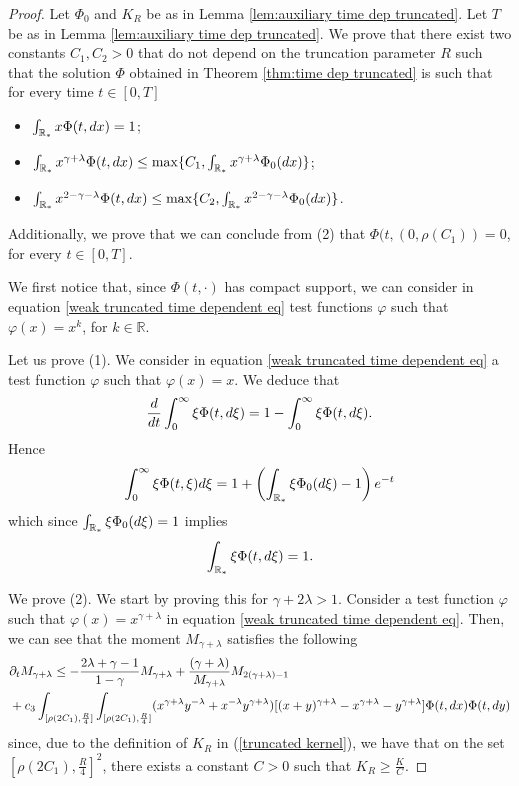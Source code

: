 \documentclass[11pt]{article}
\numberwithin{equation}{section}
\theoremstyle{plain}
\newcommand{\der}{\textup{d}}
\begin{document}
\begin{proof}

Let $\Phi_0$ and $K_R$ be as in Lemma \ref{lem:auxiliary time dep truncated}. 
Let $T$ be as in Lemma \ref{lem:auxiliary time dep truncated}. We prove that there exist two constants $C_{1},C_{2}>0$ that do not depend on the truncation parameter $R$ such that the solution $\Phi$ obtained in Theorem \ref{thm:time dep truncated} is such that for every time $t \in [0, T] $ 
\begin{itemize}
        \item[(1)]
$\int_{\mathbb R_* } x \Phi(t,\der x) = 1$; 
    \item[(2)]$\int_{\mathbb R_* } x^{\gamma + \lambda } \Phi(t, \der x) \leq \max\{ C_1,\int_{\mathbb R_* } x^{\gamma + \lambda } \Phi_{0}( \der x)\}$; 
    \item[(3)] $\int_{\mathbb R_* } x^{2- \gamma - \lambda } \Phi(t, \der x) \leq  \max\{C_{2},\int_{\mathbb R_* } x^{2-\gamma-\lambda} \Phi_{0}( \der x)\}$.
\end{itemize}
Additionally, we prove that we can conclude from (2) that $\Phi(t,(0,\rho(C_{1}))=0$, for every $t\in[0,T]$.

We first notice that, since $\Phi(t, \cdot)$ has compact support, we can consider in equation \eqref{weak truncated time dependent eq} test functions $\varphi$ such that $\varphi(x)=x^{k} $, for $k\in\mathbb{R}.$

Let us prove (1). We consider in equation \eqref{weak truncated time dependent eq} a test function $\varphi$ such that $\varphi(x)=x $.
We deduce that 
\[
\frac{d}{dt} \int_0^\infty \xi \Phi(t, \der \xi)=1- \int_0^\infty \xi \Phi(t,\der \xi).
\]
Hence 
\[
\int_0^\infty \xi \Phi(t,\xi) d \xi = 1+ \left( \int_{\mathbb R_*} \xi \Phi_0(\der\xi) -1 \right) e^{-t} 
\]
which since $\int_{\mathbb R_*} \xi \Phi_0(\der \xi)=1 $ implies 
\begin{equation} \label{lower bound mass truncated}
 \int_{\mathbb R_*}\xi \Phi(t, \der \xi) = 1.
\end{equation} 



We prove (2). 
We start by proving this for $\gamma + 2 \lambda >1. $
Consider a test function $\varphi $ such that $\varphi(x)=x^{\gamma +\lambda}$
in equation \eqref{weak truncated time dependent eq}. 
Then, we can see that the moment $M_{\gamma + \lambda}$ satisfies the following 
\begin{align*}
& \partial_{t}M_{\gamma +\lambda} \leq - \frac{2\lambda + \gamma -1 }{1-\gamma} M_{\gamma+\lambda}
+ \frac{(\gamma +\lambda)}{M_{\gamma+\lambda}}  M_{2(\gamma+\lambda)-1} \\
&+ c_{3}\int_{[\rho(2C_{1}), \frac{R}{4}] }
 \int_{[\rho(2C_{1}), \frac{R}{4} ] } (x^{\gamma + \lambda} y^{-\lambda} + x^{-\lambda} y^{\gamma + \lambda} ) [ (x+y)^{\gamma + \lambda} - x^{\gamma + \lambda} - y^{\gamma + \lambda}]  \Phi(t, \der x ) \Phi(t, \der y ) 
 \end{align*} 
since, due to the definition of $K_{R}$ in (\ref{truncated kernel}), we have that on the set $[\rho(2C_{1}),\frac{R}{4}]^{2}$, there exists a constant $C>0$ such that $K_{R}\geq\frac{K}{C}$. 


\end{proof}
\end{document}
